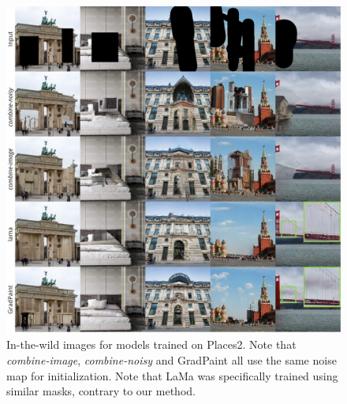 \begin{figure}[htbp]
  \centering
    \includegraphics[width=\linewidth]{images/gradpaint/places2.pdf}
    \caption{In-the-wild images for models trained on Places2. Note that \emph{combine-image}, \emph{combine-noisy} and GradPaint all use the same noise map for initialization. Note that LaMa was specifically trained using similar masks, contrary to our method.}
    \label{fig:places}
\end{figure}

